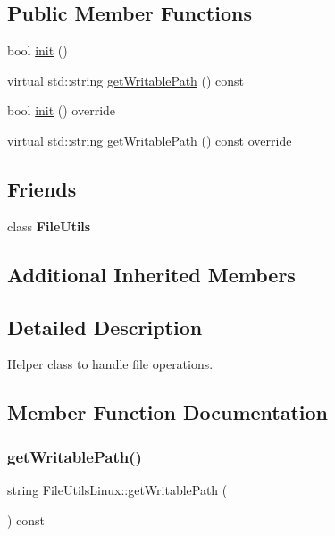 \subsection*{Public Member Functions}
\begin{DoxyCompactItemize}
\item 
bool \hyperlink{classFileUtilsLinux_a1f11f2fb2b248fe6670cf991251d2821}{init} ()
\item 
virtual std\+::string \hyperlink{classFileUtilsLinux_a67c863ea1f03b866be4d8be53d4103a1}{get\+Writable\+Path} () const
\item 
bool \hyperlink{classFileUtilsLinux_a6de155528c1b10597d623f784b72762c}{init} () override
\item 
virtual std\+::string \hyperlink{classFileUtilsLinux_a8d7c6a6b1d749016cf44849f4842407b}{get\+Writable\+Path} () const override
\end{DoxyCompactItemize}
\subsection*{Friends}
\begin{DoxyCompactItemize}
\item 
\mbox{\label{classFileUtilsLinux_ab3d3da2a9e626c1aae143a4f83d35bdf}} 
class {\bfseries File\+Utils}
\end{DoxyCompactItemize}
\subsection*{Additional Inherited Members}


\subsection{Detailed Description}
Helper class to handle file operations. 

\subsection{Member Function Documentation}
\mbox{\label{classFileUtilsLinux_a67c863ea1f03b866be4d8be53d4103a1}} 
\subsubsection{\texorpdfstring{get\+Writable\+Path()}{getWritablePath()}\hspace{0.1cm}{\footnotesize\ttfamily [1/2]}}
{\footnotesize\ttfamily string File\+Utils\+Linux\+::get\+Writable\+Path (\begin{DoxyParamCaption}{ }\end{DoxyParamCaption}) const\hspace{0.3cm}{\ttfamily [virtual]}}

